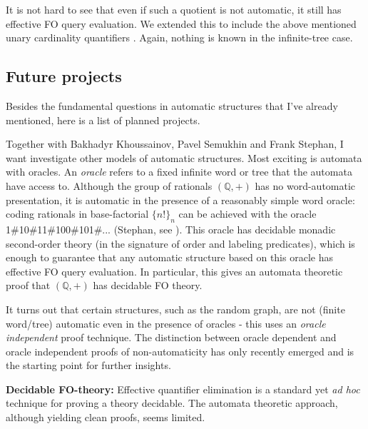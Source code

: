 \documentclass[11pt]{article}
\theoremstyle{plain} \numberwithin{equation}{section}
\theoremstyle{definition}
\begin{document}
It is not hard to see that even if such a quotient is not automatic, it still has effective FO query evaluation. We extended this to include the above mentioned unary cardinality quantifiers \cite{BKRu08}. Again, nothing is known in the infinite-tree case.

\begin{center}
\subsection*{Future projects}
\end{center}
\noindent
Besides the fundamental questions in automatic structures that I've already mentioned, here is a list of planned projects.

  Together with Bakhadyr Khoussainov,
Pavel Semukhin and Frank Stephan, I want investigate other models of automatic
structures.  Most exciting is automata with oracles. An {\it oracle} refers to
a fixed infinite word or tree that the automata have access to. Although the
group of rationals $(\mathbb{Q},+)$ has no word-automatic presentation, it is automatic
in the presence of a reasonably simple word oracle: coding rationals in
base-factorial $\{n!\}_n$ can be achieved with the oracle
1\#10\#11\#100\#101\#... (Stephan, see \cite{Nies}). This oracle has decidable
monadic second-order theory (in the signature of order and labeling
predicates), which is enough to guarantee that any automatic structure based on
this oracle has effective FO query evaluation. In particular, this gives an
automata theoretic proof that $(\mathbb{Q},+)$ has decidable FO theory. 

It turns out that certain structures, such as the random graph, are not (finite
word/tree) automatic even in the presence of oracles \cite{CoLo06} - this uses
an {\it oracle independent} proof technique. The distinction between oracle
dependent and oracle independent proofs of non-automaticity has only recently
emerged and is the starting point for further insights.




\noindent
{\bf Decidable FO-theory:} Effective quantifier elimination is a standard yet
{\it ad hoc} technique for proving a theory decidable. The automata theoretic
approach, although yielding clean proofs, seems limited.
\end{document}

